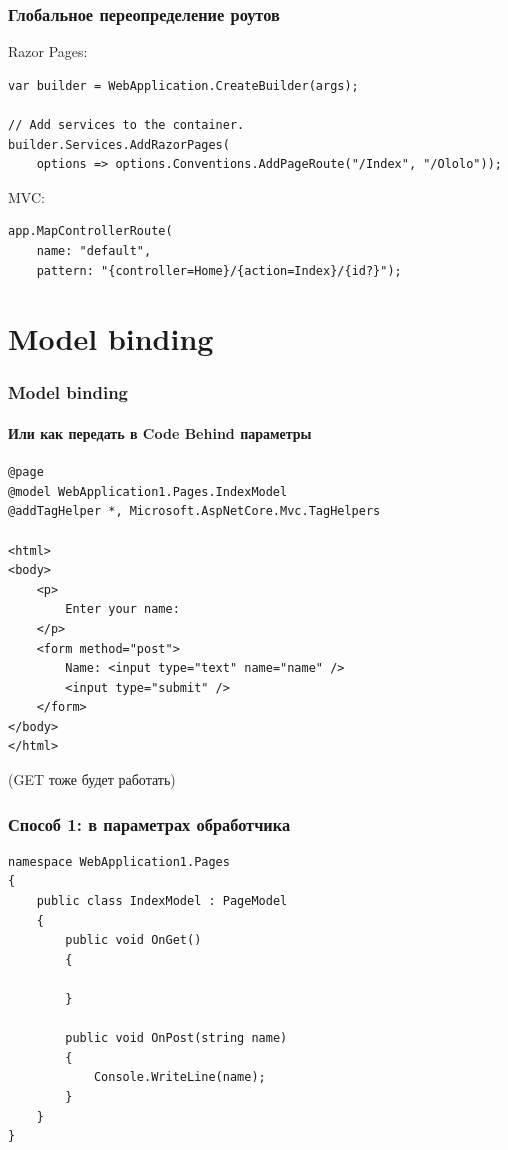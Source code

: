 \documentclass[xetex,mathserif,serif]{beamer}
\begin{document}
    \begin{frame}[fragile]
        \frametitle{Глобальное переопределение роутов}
        Razor Pages:
        \begin{verbatim}
var builder = WebApplication.CreateBuilder(args);

// Add services to the container.
builder.Services.AddRazorPages(
    options => options.Conventions.AddPageRoute("/Index", "/Ololo"));
        \end{verbatim}
        \vspace{5mm}
        MVC:
        \begin{verbatim}
app.MapControllerRoute(
    name: "default",
    pattern: "{controller=Home}/{action=Index}/{id?}");
        \end{verbatim}
    \end{frame}

    \section{Model binding}

    \begin{frame}[fragile]
        \frametitle{Model binding}
        \framesubtitle{Или как передать в Code Behind параметры}
        \begin{small}
            \begin{verbatim}
@page
@model WebApplication1.Pages.IndexModel
@addTagHelper *, Microsoft.AspNetCore.Mvc.TagHelpers

<html>
<body>
    <p>
        Enter your name:
    </p>
    <form method="post">
        Name: <input type="text" name="name" />
        <input type="submit" />
    </form>
</body>
</html>
            \end{verbatim}
        \end{small}
        (GET тоже будет работать)
    \end{frame}

    \begin{frame}[fragile]
        \frametitle{Способ 1: в параметрах обработчика}
        \begin{small}
            \begin{verbatim}
namespace WebApplication1.Pages
{
    public class IndexModel : PageModel
    {
        public void OnGet()
        {

        }

        public void OnPost(string name)
        {
            Console.WriteLine(name);
        }
    }
}
            \end{verbatim}
        \end{small}
    \end{frame}
\end{document}
